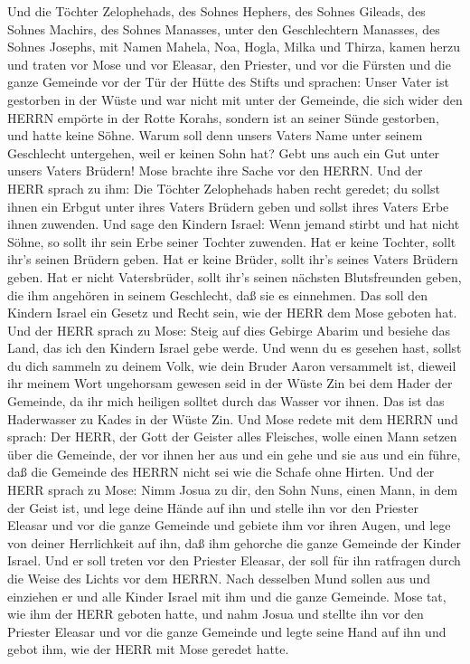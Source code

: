  Und die Töchter Zelophehads, des Sohnes Hephers, des Sohnes
Gileads, des Sohnes Machirs, des Sohnes Manasses, unter den
Geschlechtern Manasses, des Sohnes Josephs, mit Namen Mahela, Noa,
Hogla, Milka und Thirza, kamen herzu  und traten vor Mose
und vor Eleasar, den Priester, und vor die Fürsten und die ganze
Gemeinde vor der Tür der Hütte des Stifts und sprachen: 
Unser Vater ist gestorben in der Wüste und war nicht mit unter der
Gemeinde, die sich wider den HERRN empörte in der Rotte Korahs, sondern
ist an seiner Sünde gestorben, und hatte keine Söhne.  Warum
soll denn unsers Vaters Name unter seinem Geschlecht untergehen, weil er
keinen Sohn hat? Gebt uns auch ein Gut unter unsers Vaters Brüdern!
 Mose brachte ihre Sache vor den HERRN.  Und der
HERR sprach zu ihm:  Die Töchter Zelophehads haben recht
geredet; du sollst ihnen ein Erbgut unter ihres Vaters Brüdern geben und
sollst ihres Vaters Erbe ihnen zuwenden.  Und sage den
Kindern Israel: Wenn jemand stirbt und hat nicht Söhne, so sollt ihr
sein Erbe seiner Tochter zuwenden.  Hat er keine Tochter,
sollt ihr's seinen Brüdern geben.  Hat er keine Brüder,
sollt ihr's seines Vaters Brüdern geben.  Hat er nicht
Vatersbrüder, sollt ihr's seinen nächsten Blutsfreunden geben, die ihm
angehören in seinem Geschlecht, daß sie es einnehmen. Das soll den
Kindern Israel ein Gesetz und Recht sein, wie der HERR dem Mose geboten
hat.  Und der HERR sprach zu Mose: Steig auf dies Gebirge
Abarim und besiehe das Land, das ich den Kindern Israel gebe werde.
 Und wenn du es gesehen hast, sollst du dich sammeln zu
deinem Volk, wie dein Bruder Aaron versammelt ist,  dieweil
ihr meinem Wort ungehorsam gewesen seid in der Wüste Zin bei dem Hader
der Gemeinde, da ihr mich heiligen solltet durch das Wasser vor ihnen.
Das ist das Haderwasser zu Kades in der Wüste Zin.  Und
Mose redete mit dem HERRN und sprach:  Der HERR, der Gott
der Geister alles Fleisches, wolle einen Mann setzen über die Gemeinde,
 der vor ihnen her aus und ein gehe und sie aus und ein
führe, daß die Gemeinde des HERRN nicht sei wie die Schafe ohne Hirten.
 Und der HERR sprach zu Mose: Nimm Josua zu dir, den Sohn
Nuns, einen Mann, in dem der Geist ist, und lege deine Hände auf ihn
 und stelle ihn vor den Priester Eleasar und vor die ganze
Gemeinde und gebiete ihm vor ihren Augen,  und lege von
deiner Herrlichkeit auf ihn, daß ihm gehorche die ganze Gemeinde der
Kinder Israel.  Und er soll treten vor den Priester
Eleasar, der soll für ihn ratfragen durch die Weise des Lichts vor dem
HERRN. Nach desselben Mund sollen aus und einziehen er und alle Kinder
Israel mit ihm und die ganze Gemeinde.  Mose tat, wie ihm
der HERR geboten hatte, und nahm Josua und stellte ihn vor den Priester
Eleasar und vor die ganze Gemeinde  und legte seine Hand
auf ihn und gebot ihm, wie der HERR mit Mose geredet hatte.

